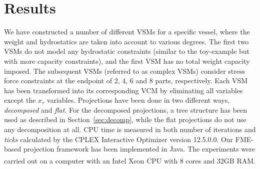 \documentclass{llncs}
\begin{document}
\section{Results}\label{sec:results}
We have constructed a number of different VSMs for a specific vessel, where the weight and hydrostatics are taken into account to various degrees. The first two VSMs %
do not model any hydrostatic constraints (similar to the toy-example but with more capacity constraints), and the first VSM has no total weight capacity imposed. The subsequent VSMs (referred to as complex VSMs) consider stress force constraints at the endpoint of 2, 4, 6 and 8 parts, respectively. 
Each VSM has been transformed into its corresponding VCM by eliminating all variables except the $x_\tau$ variables. Projections have been done in two different ways, \emph{decomposed} and \emph{flat}. For the decomposed projections, a tree structure has been used as described in Section~\ref{sec:decomp}, while the flat projections do not use any decomposition at all. CPU time is measured in both number of iterations and \emph{ticks} calculated by the CPLEX Interactive Optimizer version 12.5.0.0. Our FME-based projection framework has been implemented in Java. The experiments were carried out on a computer with an {Intel\textsuperscript{\textregistered} Xeon\textsuperscript{\textregistered} CPU with 8 cores and 32GB RAM.}
\end{document}

